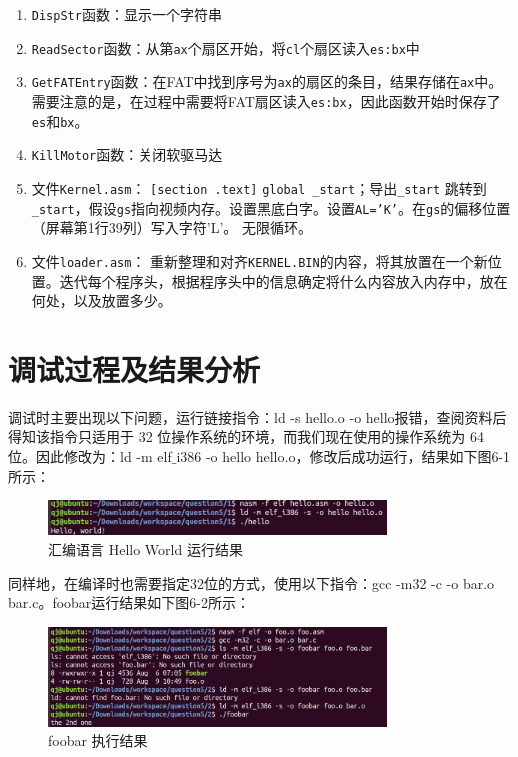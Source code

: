 \begin{enumerate}
    \item \texttt{DispStr}函数：显示一个字符串

    \item \texttt{ReadSector}函数：从第\texttt{ax}个扇区开始，将\texttt{cl}个扇区读入\texttt{es:bx}中

    \item \texttt{GetFATEntry}函数：在FAT中找到序号为\texttt{ax}的扇区的条目，结果存储在\texttt{ax}中。需要注意的是，在过程中需要将FAT扇区读入\texttt{es:bx}，因此函数开始时保存了\texttt{es}和\texttt{bx}。

    \item \texttt{KillMotor}函数：关闭软驱马达
    
    \item 文件\texttt{Kernel.asm}：
    \texttt{[section .text]}
    \texttt{global \_start}；导出\texttt{\_start}
    跳转到\texttt{\_start}，假设\texttt{gs}指向视频内存。设置黑底白字。设置\texttt{AL='K'}。在\texttt{gs}的偏移位置（屏幕第1行39列）写入字符'L'。
    无限循环。
    
    \item 文件\texttt{loader.asm}：
    重新整理和对齐\texttt{KERNEL.BIN}的内容，将其放置在一个新位置。迭代每个程序头，根据程序头中的信息确定将什么内容放入内存中，放在何处，以及放置多少。
\end{enumerate}


\section{调试过程及结果分析}
调试时主要出现以下问题，运行链接指令：ld -s hello.o -o hello报错，查阅资料后得知该指令只适用于 32 位操作系统的环境，而我们现在使用的操作系统为 64 位。因此修改为：ld -m elf$\_$i386 -o hello hello.o，修改后成功运行，结果如下图6-1所示：
\begin{figure}[H]
  \centering
  \includegraphics[width=0.8\textwidth]{figures/chapter6/6-1.jpg}
  \caption{汇编语言 Hello World 运行结果 }
  \label{fig:1}
\end{figure}

同样地，在编译时也需要指定32位的方式，使用以下指令：gcc -m32 -c -o bar.o bar.c。foobar运行结果如下图6-2所示：
\begin{figure}[H]
  \centering
  \includegraphics[width=0.8\textwidth]{figures/chapter6/6-2.jpg}
  \caption{foobar 执行结果}
  \label{fig:2}
\end{figure}

